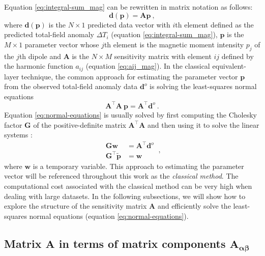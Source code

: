 \documentclass[manuscript]{geophysics}
\begin{document}
Equation \ref{eq:integral-sum_mag} can be rewritten in matrix notation as follows:
\begin{equation}
	\mathbf{d}(\mathbf{p}) = \mathbf{A} \mathbf{p} \: ,
	\label{eq:predicted-data-vector_mag}
\end{equation}
where $\mathbf{d}(\mathbf{p})$ is the $N \times 1$ predicted data vector with $i$th element defined
as the predicted total-field anomaly $\Delta T_{i}$ (equation \ref{eq:integral-sum_mag}),
$\mathbf{p}$ is the $M \times 1$ parameter vector whose $j$th element is the magnetic moment intensity
$p_{j}$ of the $j$th dipole and $\mathbf{A}$ is the $N \times M$ sensitivity matrix with element 
$ij$ defined by the harmonic function $a_{ij}$ (equation \ref{eq:aij_mag}).
In the classical equivalent-layer technique, the common approach for 
estimating the parameter vector $\mathbf{p}$ from the observed 
total-field anomaly data $\mathbf{d}^{o}$ is solving the least-squares normal equations
\begin{equation}
	\mathbf{A}^{\top}\mathbf{A} \: \mathbf{p} = 
	\mathbf{A}^{\top} \mathbf{d}^{o} \: .
	\label{eq:normal-equations}
\end{equation}
Equation \ref{eq:normal-equations} is usually solved by first computing the Cholesky 
factor $\mathbf{G}$ of the positive-definite matrix $\mathbf{A}^{\top}\mathbf{A}$ and then using it to solve the linear 
systems \citep[][ p. 262]{golub-vanloan2013}:
\begin{equation}
	\begin{split}
		\mathbf{G} \mathbf{w} &= \mathbf{A}^{\top}\mathbf{d}^{o} \\
		\mathbf{G}^{\top} \tilde{\mathbf{p}} &= \mathbf{w}
	\end{split} \: ,
	\label{eq:classical-method}
\end{equation}
where $\mathbf{w}$ is a temporary variable.
This approach to estimating the parameter vector will be 
referenced throughout this work as the \textit{classical method}.
The computational cost associated with the classical method can be very high
when dealing with large datasets. In the following subsections, we will show how to 
explore the structure of the sensitivity matrix $\mathbf{A}$ and 
efficiently solve the least-squares normal equations (equation \ref{eq:normal-equations}).


\subsection{Matrix $\mathbf{A}$ in terms of matrix components $\mathbf{A_{\boldsymbol{\alpha\beta}}}$}
\end{document}
